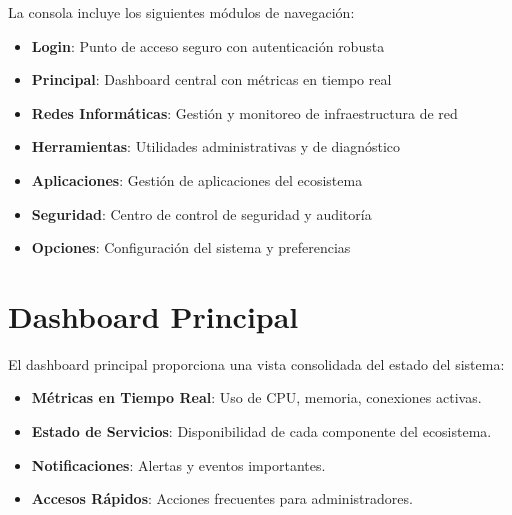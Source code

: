 La consola incluye los siguientes módulos de navegación:

\begin{itemize}
\item \textbf{Login}: Punto de acceso seguro con autenticación robusta
\item \textbf{Principal}: Dashboard central con métricas en tiempo real
\item \textbf{Redes Informáticas}: Gestión y monitoreo de infraestructura de red
\item \textbf{Herramientas}: Utilidades administrativas y de diagnóstico
\item \textbf{Aplicaciones}: Gestión de aplicaciones del ecosistema
\item \textbf{Seguridad}: Centro de control de seguridad y auditoría
\item \textbf{Opciones}: Configuración del sistema y preferencias
\end{itemize}

\section{Dashboard Principal}

El dashboard principal proporciona una vista consolidada del estado del sistema:

\begin{itemize}
\item \textbf{Métricas en Tiempo Real}: Uso de CPU, memoria, conexiones activas.
\item \textbf{Estado de Servicios}: Disponibilidad de cada componente del ecosistema.
\item \textbf{Notificaciones}: Alertas y eventos importantes.
\item \textbf{Accesos Rápidos}: Acciones frecuentes para administradores.
\end{itemize}

\clearpage

